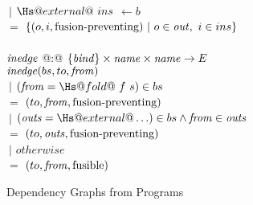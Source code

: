 \begin{figure}
\begin{tabbing}
\\[1ex]
   \> $~|$ \> $\Hs@external@~ins$ \> \> $\gets b$ \\
    \> $=$    \> $\{(o,i, \mbox{fusion-preventing}) ~|~ o \in \mathit{out},~ i \in ins \}$
\\
\\
$\mathit{inedge}$ @:@ $\{\mathit{bind}\} \times \mathit{name} \times \mathit{name} \to E$
\\
$\mathit{inedge}(bs,to,\mathit{from})$ \\
    \> $~|$ \> $(\from = \Hs@fold@~f~s) \in bs$     \\
    \> $=$ \> $(to, \mathit{from}, \mbox{fusion-preventing})$
\\[1ex]
    \> $~|$ \> $(\outs = \Hs@external@ \ldots) \in bs     \wedge \from \in \outs$     \\
    \> $=$ \> $(to, \mathit{outs}, \mbox{fusion-preventing})$
\\[1ex]
    \> $~|$ \> $otherwise$                      \\
    \> $=$ \> $(to, \mathit{from}, \mathrm{fusible})$
\end{tabbing}

\caption{Dependency Graphs from Programs}
\label{clustering:f:DependencyGraph}
\end{figure}

